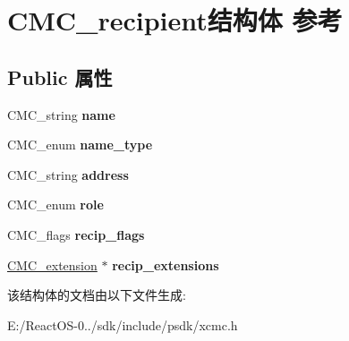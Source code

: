 \hypertarget{struct_c_m_c__recipient}{}\section{C\+M\+C\+\_\+recipient结构体 参考}
\label{struct_c_m_c__recipient}
\subsection*{Public 属性}
\begin{DoxyCompactItemize}
\item 
\mbox{\label{struct_c_m_c__recipient_a4e9e0c1500ceed9d9fb28e916546461f}} 
C\+M\+C\+\_\+string {\bfseries name}
\item 
\mbox{\label{struct_c_m_c__recipient_adb08b7351d6a7f1ea903e96212fbdc69}} 
C\+M\+C\+\_\+enum {\bfseries name\+\_\+type}
\item 
\mbox{\label{struct_c_m_c__recipient_a61e4f3d8c585f32b7c16b20a88b99fc1}} 
C\+M\+C\+\_\+string {\bfseries address}
\item 
\mbox{\label{struct_c_m_c__recipient_a949c8b0b6a29d916c99e242052f6392b}} 
C\+M\+C\+\_\+enum {\bfseries role}
\item 
\mbox{\label{struct_c_m_c__recipient_a87cc15900b951e8ef7fa35e0c39beb75}} 
C\+M\+C\+\_\+flags {\bfseries recip\+\_\+flags}
\item 
\mbox{\label{struct_c_m_c__recipient_ab5d83ae8815f1e21abb38e415bac732a}} 
\hyperlink{struct_c_m_c__extension}{C\+M\+C\+\_\+extension} $\ast$ {\bfseries recip\+\_\+extensions}
\end{DoxyCompactItemize}


该结构体的文档由以下文件生成\+:\begin{DoxyCompactItemize}
\item 
E\+:/\+React\+O\+S-\/0../sdk/include/psdk/xcmc.\+h\end{DoxyCompactItemize}
